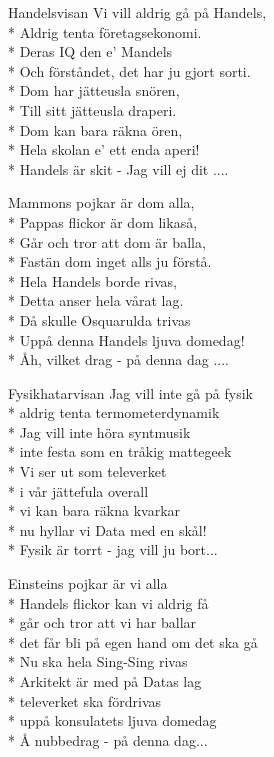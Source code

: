 \documentclass[a4paper, twoside, titlepage]{blad}
\begin{document}
\begin{sang}{Handelsvisan}
Vi vill aldrig gå på Handels,\\*
Aldrig tenta företagsekonomi.\\*
Deras IQ den e' Mandels\\*
Och förståndet, det har ju gjort sorti.\\*
Dom har jätteusla snören,\\*
Till sitt jätteusla draperi.\\*
Dom kan bara räkna ören,\\*
Hela skolan e' ett enda aperi!\\*
Handels är skit - Jag vill ej dit ....

Mammons pojkar är dom alla,\\*
Pappas flickor är dom likaså,\\*
Går och tror att dom är balla,\\*
Fastän dom inget alls ju förstå.\\*
Hela Handels borde rivas,\\*
Detta anser hela vårat lag.\\*
Då skulle Osquarulda trivas\\*
Uppå denna Handels ljuva domedag!\\*
Åh, vilket drag - på denna dag ....
\end{sang}

\begin{sang}{Fysikhatarvisan}
Jag vill inte gå på fysik\\*
aldrig tenta termometerdynamik\\*
Jag vill inte höra syntmusik\\*
inte festa som en tråkig mattegeek\\*
Vi ser ut som televerket\\*
i vår jättefula overall\\*
vi kan bara räkna kvarkar\\*
nu hyllar vi Data med en skål!\\*
Fysik är torrt - jag vill ju bort...

Einsteins pojkar är vi alla\\*
Handels flickor kan vi aldrig få\\*
går och tror att vi har ballar\\*
det får bli på egen hand om det ska gå\\*
Nu ska hela Sing-Sing rivas\\*
Arkitekt är med på Datas lag\\*
televerket ska fördrivas\\*
uppå konsulatets ljuva domedag\\*
Å nubbedrag - på denna dag...
\end{sang}
\end{document}
